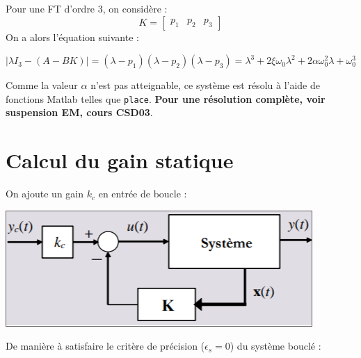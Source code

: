 Pour une FT d'ordre 3, on considère :
\[
K = 
\begin{bmatrix}
    p_{1} & p_{2} & p_{3}
\end{bmatrix}
\]
On a alors l'équation suivante :
\begin{center}
    \Large{$
    |\lambda I_{3} - (A - BK) | = (\lambda - p_{1})(\lambda - p_{2})(\lambda - p_{3}) = \lambda^{3} + 2\xi \omega_{0}\lambda^{2} + 2\alpha \omega_{0}^{2}\lambda + \omega_{0}^{3} 
    $}    
\end{center}
Comme la valeur $\alpha$ n'est pas atteignable, ce système est résolu à l'aide de fonctions Matlab telles que \texttt{place}. \textbf{Pour une résolution complète, voir suspension EM, cours CSD03}.
\newpage
\section{Calcul du gain statique}
On ajoute un gain $k_{c}$ en entrée de boucle :
\begin{center}
    \includegraphics[scale=0.5]{Pics/retour_etat_KC.png}
\end{center}
De manière à satisfaire le critère de précision ($\epsilon_{s} = 0$) du
système bouclé : 
